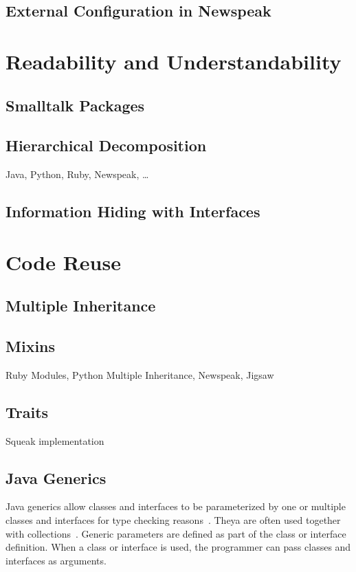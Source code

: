 \subsection{External Configuration in Newspeak}

\section{Readability and Understandability}

\subsection{Smalltalk Packages}

\subsection{Hierarchical Decomposition}
Java, Python, Ruby, Newspeak, \ldots

\subsection{Information Hiding with Interfaces}


\section{Code Reuse}

\subsection{Multiple Inheritance}

\subsection{Mixins}
Ruby Modules, Python Multiple Inheritance, Newspeak, Jigsaw

\subsection{Traits}
\label{sec:rel_traits}
Squeak implementation

\subsection{Java Generics}
Java generics allow classes and interfaces to be parameterized by one or multiple classes and interfaces for type checking reasons~\cite{bracha2004generics}. Theya are often used together with collections~\cite{Parnin:2011:JGA:1985441.1985446}. Generic parameters are defined as part of the class or interface definition. When a class or interface is used, the programmer can pass classes and interfaces as arguments.

